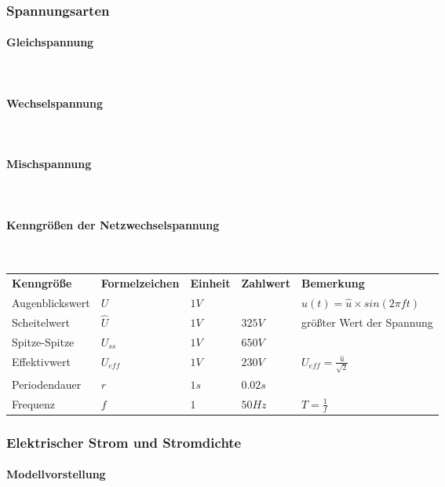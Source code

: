 	\subsubsection{Spannungsarten}
		\paragraph{Gleichspannung}~\\
		\paragraph{Wechselspannung}~\\
		\paragraph{Mischspannung}~\\
		\paragraph{Kenngrößen der Netzwechselspannung}~\\
		
\begin{tabular}{lllll}
{\bf Kenngröße}	& {\bf Formelzeichen}	& {\bf Einheit} & {\bf Zahlwert} & {\bf Bemerkung}\\ 
Augenblickswert	& $U$ 					& $1V$	& & $u(t)=\hat{u}\times sin(2\pi f t)$\\
Scheitelwert		& $\widehat{U}$			& $1V$	& $325V$		& größter Wert der Spannung\\
Spitze-Spitze	& $U_{ss}$				& $1V$	& $650V$		& \\
Effektivwert		& $U_{eff}$				& $1V$	& $230V$		& $U_{eff}=\frac{\hat{u}}{\sqrt{2}}$\\
Periodendauer	& $r$					& $1s$	& $0.02s$	& \\
Frequenz			& $f$					& $1$	& $50 Hz$	& $T = \frac{1}{f}$ \\
\end{tabular}		
		
	\subsubsection{Elektrischer Strom und Stromdichte}
		\paragraph{Modellvorstellung}~\\

